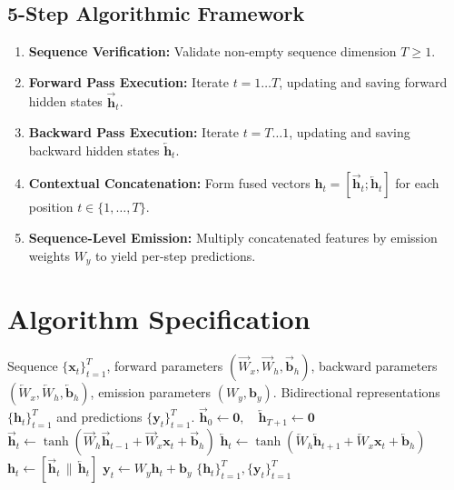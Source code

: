 \documentclass[11pt,a4paper]{article}
\theoremstyle{definition}
\begin{document}
\subsection{5-Step Algorithmic Framework}
\begin{enumerate}
    \item \textbf{Sequence Verification:} Validate non-empty sequence dimension $T \ge 1$.
    \item \textbf{Forward Pass Execution:} Iterate $t = 1 \dots T$, updating and saving forward hidden states $\overrightarrow{\mathbf{h}}_t$.
    \item \textbf{Backward Pass Execution:} Iterate $t = T \dots 1$, updating and saving backward hidden states $\overleftarrow{\mathbf{h}}_t$.
    \item \textbf{Contextual Concatenation:} Form fused vectors $\mathbf{h}_t = [\overrightarrow{\mathbf{h}}_t; \overleftarrow{\mathbf{h}}_t]$ for each position $t \in \{1,\dots, T\}$.
    \item \textbf{Sequence-Level Emission:} Multiply concatenated features by emission weights $W_y$ to yield per-step predictions.
\end{enumerate}

\section{Algorithm Specification}

\begin{algorithm}[H]
\caption{Bidirectional Recurrent Neural Network (BiRNN)}
\label{alg:birnn}
\begin{algorithmic}[1]
\Require Sequence $\{\mathbf{x}_t\}_{t=1}^T$, forward parameters $(\overrightarrow{W}_x, \overrightarrow{W}_h, \overrightarrow{\mathbf{b}}_h)$, backward parameters $(\overleftarrow{W}_x, \overleftarrow{W}_h, \overleftarrow{\mathbf{b}}_h)$, emission parameters $(W_y, \mathbf{b}_y)$.
\Ensure Bidirectional representations $\{\mathbf{h}_t\}_{t=1}^T$ and predictions $\{\mathbf{y}_t\}_{t=1}^T$.
\State $\overrightarrow{\mathbf{h}}_0 \gets \mathbf{0}, \quad \overleftarrow{\mathbf{h}}_{T+1} \gets \mathbf{0}$
 
    \State $\overrightarrow{\mathbf{h}}_t \gets \tanh(\overrightarrow{W}_h \overrightarrow{\mathbf{h}}_{t-1} + \overrightarrow{W}_x \mathbf{x}_t + \overrightarrow{\mathbf{b}}_h)$
\EndFor
{} 
    \State $\overleftarrow{\mathbf{h}}_t \gets \tanh(\overleftarrow{W}_h \overleftarrow{\mathbf{h}}_{t+1} + \overleftarrow{W}_x \mathbf{x}_t + \overleftarrow{\mathbf{b}}_h)$
\EndFor
{} 
    \State $\mathbf{h}_t \gets [\overrightarrow{\mathbf{h}}_t \,\|\, \overleftarrow{\mathbf{h}}_t]$
    \State $\mathbf{y}_t \gets W_y \mathbf{h}_t + \mathbf{b}_y$
\EndFor
\State \Return $\{\mathbf{h}_t\}_{t=1}^T, \{\mathbf{y}_t\}_{t=1}^T$
\end{algorithmic}
\end{algorithm}
\end{document}
